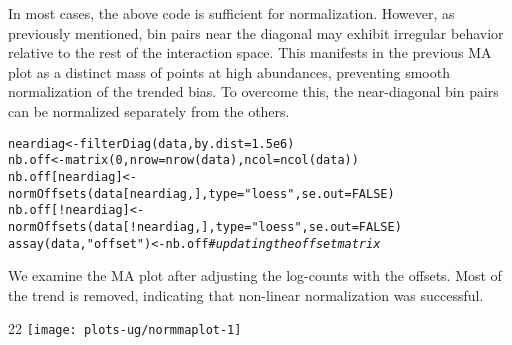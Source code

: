 \documentclass{report}\usepackage[]{graphicx}\usepackage[usenames,dvipsnames]{color}
\makeatletter
\def\maxwidth{ %
  \ifdim\Gin@nat@width>\linewidth
    \linewidth
  \else
    \Gin@nat@width
  \fi
}
\newcommand{\hlnum}[1]{\textcolor[rgb]{0.816,0.125,0.439}{#1}}%
\newcommand{\hlstr}[1]{\textcolor[rgb]{0.251,0.627,0.251}{#1}}%
\newcommand{\hlcom}[1]{\textcolor[rgb]{0.502,0.502,0.502}{\textit{#1}}}%
\newcommand{\hlopt}[1]{\textcolor[rgb]{0,0,0}{#1}}%
\newcommand{\hlstd}[1]{\textcolor[rgb]{0.251,0.251,0.251}{#1}}%
\newcommand{\hlkwb}[1]{\textcolor[rgb]{0,0,0}{#1}}%
\newcommand{\hlkwc}[1]{\textcolor[rgb]{0.251,0.251,0.251}{#1}}%
\newcommand{\hlkwd}[1]{\textcolor[rgb]{0.878,0.439,0.125}{#1}}%
\newenvironment{knitrout}{}{} %
\makeatother
\begin{document}
In most cases, the above code is sufficient for normalization.
However, as previously mentioned, bin pairs near the diagonal may exhibit irregular behavior relative to the rest of the interaction space.
This manifests in the previous MA plot as a distinct mass of points at high abundances, preventing smooth normalization of the trended bias.
To overcome this, the near-diagonal bin pairs can be normalized separately from the others.

\begin{knitrout}
\color{fgcolor}\begin{kframe}
\begin{alltt}
\hlstd{neardiag} \hlkwb{<-} \hlkwd{filterDiag}\hlstd{(data,} \hlkwc{by.dist}\hlstd{=}\hlnum{1.5e6}\hlstd{)}
\hlstd{nb.off} \hlkwb{<-} \hlkwd{matrix}\hlstd{(}\hlnum{0}\hlstd{,} \hlkwc{nrow}\hlstd{=}\hlkwd{nrow}\hlstd{(data),} \hlkwc{ncol}\hlstd{=}\hlkwd{ncol}\hlstd{(data))}
\hlstd{nb.off[neardiag]} \hlkwb{<-} \hlkwd{normOffsets}\hlstd{(data[neardiag,],} \hlkwc{type}\hlstd{=}\hlstr{"loess"}\hlstd{,} \hlkwc{se.out}\hlstd{=}\hlnum{FALSE}\hlstd{)}
\hlstd{nb.off[}\hlopt{!}\hlstd{neardiag]} \hlkwb{<-} \hlkwd{normOffsets}\hlstd{(data[}\hlopt{!}\hlstd{neardiag,],} \hlkwc{type}\hlstd{=}\hlstr{"loess"}\hlstd{,} \hlkwc{se.out}\hlstd{=}\hlnum{FALSE}\hlstd{)}
\hlkwd{assay}\hlstd{(data,} \hlstr{"offset"}\hlstd{)} \hlkwb{<-} \hlstd{nb.off} \hlcom{# updating the offset matrix}
\end{alltt}
\end{kframe}
\end{knitrout}

We examine the MA plot after adjusting the log-counts with the offsets.
Most of the trend is removed, indicating that non-linear normalization was successful.



\begin{knitrout}
\color{fgcolor}\begin{adjustwidth}{2\fltoffset}{2\fltoffset}
\texttt{[image: plots-ug/normmaplot-1]} \end{adjustwidth}
\end{knitrout}
\end{document}
